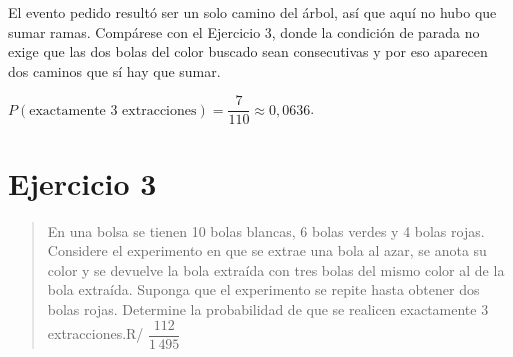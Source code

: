 \documentclass[11pt]{article}
\begin{document}
\begin{nota}
El evento pedido resultó ser un solo camino del árbol, así que aquí no hubo que sumar ramas. Compárese con el Ejercicio 3, donde la condición de parada no exige que las dos bolas del color buscado sean consecutivas y por eso aparecen dos caminos que sí hay que sumar.
\end{nota}

\begin{resp}
$P(\text{exactamente 3 extracciones})=\dfrac{7}{110}\approx 0{,}0636$.
\end{resp}

\section*{Ejercicio 3}

\begin{quote}
En una bolsa se tienen 10 bolas blancas, 6 bolas verdes y 4 bolas rojas. Considere el experimento en que se extrae una bola al azar, se anota su color y se devuelve la bola extraída con tres bolas del mismo color al de la bola extraída. Suponga que el experimento se repite hasta obtener dos bolas rojas. Determine la probabilidad de que se realicen exactamente 3 extracciones.\hfill R/ $\dfrac{112}{1\,495}$
\end{quote}
\end{document}
